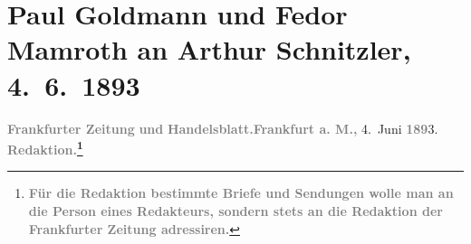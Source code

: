 

         
         \renewcommand{\erwaehntePersonen}{Personen: Samuel Fischer, Carl Freund, Wilhelm Friedrich, Paul Goldmann, Max Jeckel, Fedor Mamroth, Edgar Pierson, Salo Schottlaender}
         \renewcommand{\erwaehnteInstitutionen}{Institutionen: E. Pierson’s Verlag, Frankfurter Zeitung, Freund {\kaufmannsund}  Jeckel, S. Fischer Verlag, S. Schottländer, Verlag Wilhelm Friedrich}
         \renewcommand{\erwaehnteOrte}{Orte: Altonaer Straße, Berlin, Breslau, Dresden, Frankfurt am Main, Köthenerstraße, Leipzig, Wien}
         \renewcommand{\erwaehnteWerke}{Werke: Frankfurter Zeitung}
               \section[Paul Goldmann und Fedor Mamroth an Arthur Schnitzler, 4. 6. 1893]{ Paul Goldmann und Fedor Mamroth an Arthur Schnitzler,
               4. 6. 1893}\nopagebreak{}\rehead{ }\begin{ledgroupsized}[t]{13cm}\normalsize\beginnumbering{} \toendnotes[C]{\smallbreak\pagebreak[2]} 
\toendnotes[C]{\smallbreak}\pstart
           \noindent{}{\pb}\textcolor{gray}{\textbf{\textbf{Frankfurter Zeitung}}}\pend
           \pstart
           \textcolor{gray}{\textbf{und}}\pend
           \pstart
           \textcolor{gray}{\textbf{\textbf{Handelsblatt}.}}\hfill \textcolor{gray}{\textbf{Frankfurt a. M.,}}{ }4. Juni \textcolor{gray}{\textbf{189}}3.\pend
           \pstart
           \textcolor{gray}{\textbf{\textbf{Redaktion.}\footnote{\noindent{}\textcolor{gray}{\textbf{Für die Redaktion bestimmte Briefe und Sendungen wolle
                              man  an die Person eines Redakteurs,
                              sondern stets \textbf{an die Redaktion der Frankfurter Zeitung} adressiren.}}}}}\pend

\end{ledgroupsized}
